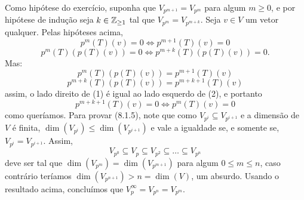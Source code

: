 \documentclass[../main.tex]{subfiles}
\begin{document}
Como hipótese do exercício, suponha que \(V_{p^{m+1}}=V_{p^m}\)
para algum \(m\geq 0\), e por hipótese de indução seja \(k\in\mathbb{Z}_{\geq 1}\)
tal que \(V_{p^m}=V_{p^{m+k}}\). Seja $v\in V$ um vetor qualquer.
Pelas hipóteses acima,
\[p^m(T)(v)=0\iff p^{m+1}(T)(v)=0\tag{1}\]
\[p^m(T)(p(T)(v))=0\iff p^{m+k}(T)(p(T)(v))=0.\tag{2}\]
Mas:
 \[p^m(T)(p(T)(v))=p^{m+1}(T)(v)\] \[p^{m+k}(T)(p(T)(v))=
p^{m+k+1}(T)(v)\]
assim, o lado direito de (1) é igual ao lado esquerdo de (2), e portanto
\[p^{m+k+1}(T)(v)=0\iff p^m(T)(v)=0\]
como queríamos. Para provar (8.1.5), note que como \(V_{p^i}
\subseteq V_{p^{i+1}}\) e a dimensão de \(V\) é finita, \(\dim(V_{p^i})\leq
\dim(V_{p^{i+1}})\) e vale a igualdade se, e somente se, 
\(V_{p^i}=V_{p^{i+1}}\). Assim, 
\[V_{p^0}\subseteq V_p\subseteq V_{p^2}\subseteq \dots\subseteq V_{p^n}\]
deve ser tal que \(\dim(V_{p^m})=\dim(V_{p^{m+1}})\) para algum \(0\leq
m\leq n\), caso contrário teríamos \(\dim(V_{p^{n+1}})> n=\dim(V)\),
um absurdo. Usando o resultado acima, concluímos que \(V_p^\infty=
V_{p^n}=V_{p^m}\).
\end{document}
